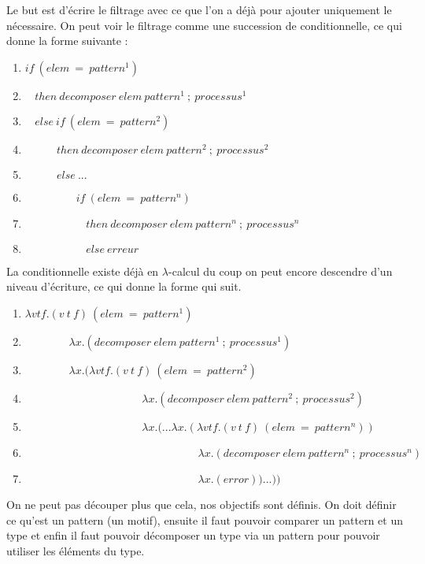 \documentclass[10pt,a4paper]{report}
\begin{document}
	
	Le but est d'écrire le filtrage avec ce que l'on a déjà pour ajouter uniquement le nécessaire. On peut voir le filtrage comme une succession de conditionnelle, ce qui donne la forme suivante :
	\begin{enumerate}
		\item $if~(elem~=~pattern^{1})$
		\item $~~~~then~decomposer~elem~pattern^{1}~;~processus^{1}$
		\item $~~~~else~if~(elem~=~pattern^{2})$
		\item $~~~~~~~~~~~~~then~decomposer~elem~pattern^{2}~;~processus^{2}$
		\item $~~~~~~~~~~~~~else~...$
		\item $~~~~~~~~~~~~~~~~~~~~~if~(elem~=~pattern^{n})$
		\item $~~~~~~~~~~~~~~~~~~~~~~~~~then~decomposer~elem~pattern^{n}~;~processus^{n}$
		\item $~~~~~~~~~~~~~~~~~~~~~~~~~else~erreur$
	\end{enumerate}
	\bigbreak
	
	
	La conditionnelle existe déjà en $\lambda$-calcul du coup on peut encore descendre d'un niveau d'écriture, ce qui donne la forme qui suit.
	\begin{enumerate}
		\item $\lambda vtf.(v~t~f)~(elem~=~pattern^{1})$
		\item $~~~~~~~~~~~~~~~~~~ \lambda x.(decomposer~elem~pattern^{1}~;~processus^{1})$
		\item $~~~~~~~~~~~~~~~~~~ \lambda x.(\lambda vtf.(v~t~f)~(elem~=~pattern^{2})$
		\item $~~~~~~~~~~~~~~~~~~~~~~~~~~~~~~~~~~~~~~~~~~~~~~~~ \lambda x.(decomposer~elem~pattern^{2}~;~processus^{2})$
		\item $~~~~~~~~~~~~~~~~~~~~~~~~~~~~~~~~~~~~~~~~~~~~~~~~ \lambda x.(...\lambda x.(\lambda vtf.(v~t~f)~(elem~=~pattern^{n}))$
		\item $~~~~~~~~~~~~~~~~~~~~~~~~~~~~~~~~~~~~~~~~~~~~~~~~~~~~~~~~~~~~~~~~~~~~~~~ \lambda x.(decomposer~elem~pattern^{n}~;~processus^{n})$
		\item $~~~~~~~~~~~~~~~~~~~~~~~~~~~~~~~~~~~~~~~~~~~~~~~~~~~~~~~~~~~~~~~~~~~~~~~\lambda x.(error))...))$
	\end{enumerate}
	\bigbreak
	
	
	On ne peut pas découper plus que cela, nos objectifs sont définis. On doit définir ce qu'est un pattern (un motif), ensuite il faut pouvoir comparer un pattern et un type et enfin il faut pouvoir décomposer un type via un pattern pour pouvoir utiliser les éléments du type.
	
\end{document}
